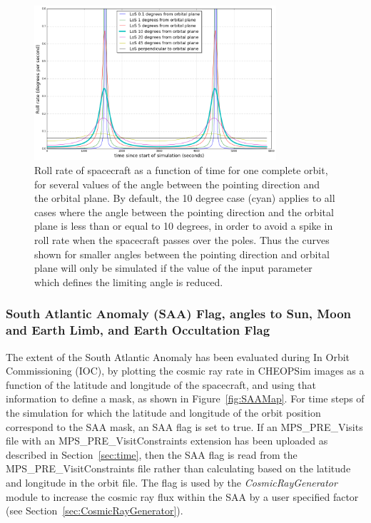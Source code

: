 \documentclass[11pt]{article}      %
\begin{document}
\begin{figure}[hbtp]
  \begin{center}
    \includegraphics[width=0.8\textwidth]{rollRate.png}
    \caption{Roll rate of spacecraft as a function of time for one complete orbit, for several values of the angle between the pointing direction and the orbital plane. By default, the 10 degree case (cyan) applies to all cases where the angle between the pointing direction and the orbital plane is less than or equal to 10 degrees, in order to avoid a spike in roll rate when the spacecraft passes over the poles. Thus the curves shown for smaller angles between the pointing direction and orbital plane will only be simulated if the value of the input parameter which defines the limiting angle is reduced.}
    \label{fig:rollRate}
  \end{center}
\end{figure}

\clearpage
\subsubsection{South Atlantic Anomaly (SAA) Flag, angles to Sun, Moon and Earth Limb, and Earth Occultation Flag}
\label{sec:SAA}

The extent of the South Atlantic Anomaly has been evaluated during In Orbit Commissioning (IOC), by plotting the cosmic ray rate in CHEOPSim images as a function of the latitude and longitude of the spacecraft, and using that information to define a mask, as shown in Figure~\ref{fig:SAAMap}. For time steps of the simulation for which the latitude and longitude of the orbit position correspond to the SAA mask, an SAA flag is set to true. If an MPS\_PRE\_Visits file with an MPS\_PRE\_VisitConstraints extension has been uploaded as described in Section~\ref{sec:time}, then the SAA flag is read from the MPS\_PRE\_VisitConstraints file rather than calculating based on the latitude and longitude in the orbit file. The flag is used by the {\it CosmicRayGenerator} module to increase the cosmic ray flux within the SAA by a user specified factor (see Section~\ref{sec:CosmicRayGenerator}).
\end{document}

